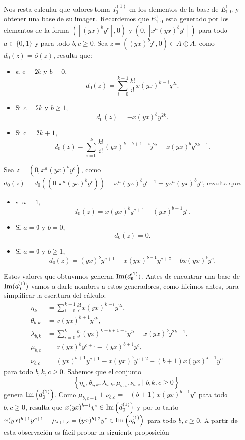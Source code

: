 \documentclass[fleqn,../tesis.tex]{subfiles}
\begin{document}
Nos resta calcular que valores toma $d_{0}^{(1)}$ en los elementos de la base de $E_{1, 0}^1$ y obtener una base de su imagen.
Recordemos que $E_{1, 0}^1$ esta generado por los elementos de la forma $\left(\left[(yx)^by^c\right], 0\right)$ y $\left(0, \left[x^a(yx)^by^c\right]\right)$
para todo $a \in \{0, 1\}$ y para todo $b, c \geq 0$. Sea $z = ((yx)^by^c, 0) \in A\oplus A$, como $d_0(z) = \partial(z)$, resulta que:
\begin{itemize}
    \item si $c = 2k$ y $b = 0$,
         \[d_0(z) = \sum_{i = 0}^{k - 1}\frac{k!}{i!}x(yx)^{k - i}y^{2i}.\]
    \item Si $c = 2k$ y  $b \geq 1$,
         \[d_0(z) = -x(yx)^by^{2k}.\]
    \item Si c = $2k + 1$,
        \[d_0(z) = \sum_{i = 0}^k\frac{k!}{i!}(yx)^{k + b + 1 - i}y^{2i} - x(yx)^by^{2k + 1}.\]
\end{itemize}
Sea $z = (0, x^a(yx)^by^c)$, como $d_0(z) = d_0((0, x^a(yx)^by^c)) = x^a(yx)^by^{c + 1} - yx^a(yx)^{b}y^c$, resulta que:
\begin{itemize}
    \item si $a = 1$,
        \[
            d_0(z) = x(yx)^by^{c + 1} - (yx)^{b + 1}y^c.        
        \]
    \item Si $a = 0$ y $b = 0$,
        \[
            d_0(z) = 0.        
        \]
    \item Si $a = 0$ y $b \geq 1$,
        \[
            d_0(z) = (yx)^{b}y^{c + 1} - x(yx)^{b - 1}y^{c + 2} - bx(yx)^{b}y^c.
        \]
\end{itemize}
Estos valores que obtuvimos generan $\operatorname{Im}(d_0^{(1)})$. Antes de encontrar una base de $\operatorname{Im}(d_0^{(1)})$ vamos a darle nombres
a estos generadores, como hicimos antes, para simplificar la escritura del cálculo:
\begin{align*}
    \eta_k &= \sum_{i = 0}^{k - 1}\frac{k!}{i!}x(yx)^{k - i}y^{2i},\\
    \theta_{b, k} &= x(yx)^{b + 1}y^{2k},\\
    \lambda_{b, k} &= \sum_{i = 0}^k \frac{k!}{i!}(yx)^{k + b + 1 - i}y^{2i} - x(yx)^by^{2k + 1},\\
    \mu_{b, c} &= x(yx)^by^{c + 1} - (yx)^{b + 1}y^c,\\
    \nu_{b, c} &= (yx)^{b + 1}y^{c + 1} - x(yx)^{b}y^{c + 2} -(b + 1)x(yx)^{b + 1}y^c
\end{align*}
para todo $b, k, c \geq 0$. Sabemos que el conjunto
\[
   \left\lbrace \eta_k, \theta_{b, k}, \lambda_{b, k}, \mu_{b, c}, \nu_{b, c} \mid b, k, c \geq 0 \right\rbrace
\]
genera $\operatorname{Im}\left(d_0^{(1)}\right)$.
Como $\mu_{b, c + 1} + \nu_{b, c} = -(b + 1)x (yx)^{b + 1}y^c$ para todo $b, c \geq 0$,
resulta que $x(yx)^{b + 1}y^c \in \operatorname{Im}\left(d_0^{(1)}\right)$ y por lo tanto
$x(yx)^{b + 1}y^{c + 1} - \mu_{b + 1, c} = (yx)^{b + 2}y^c \in \operatorname{Im}\left(d_0^{(1)}\right)$ para todo $b, c \geq 0$.
A partir de esta observación es fácil probar la siguiente proposición.
\end{document}
